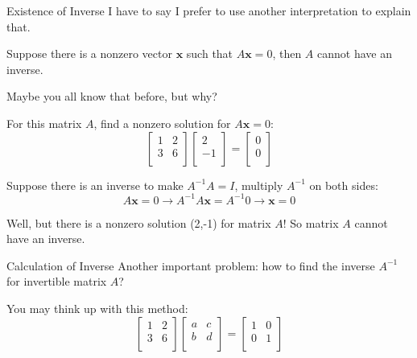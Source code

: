 \documentclass{beamer}
\begin{document}
\begin{frame}{Existence of Inverse}
I have to say I prefer to use another interpretation to explain that.

\begin{theorem}
Suppose there is a nonzero vector $\mathbf{x}$ such that $A\mathbf{x}=0$, then $A$ cannot have an inverse.
\end{theorem}

Maybe you all know that before, but why?

For this matrix $A$, find a nonzero solution for $A\mathbf{x}=0$:
\begin{equation*}
    \left[ \begin{matrix}
        1&		2\\
        3&		6\\
    \end{matrix} \right] \left[ \begin{array}{c}
        2\\
        -1\\
    \end{array} \right] =\left[ \begin{array}{c}
        0\\
        0\\
    \end{array} \right]
\end{equation*}

Suppose there is an inverse to make $A^{-1}A=I$, multiply $A^{-1}$ on both sides:
\begin{equation*}
    A\mathbf{x}=0\rightarrow A^{-1}A\mathbf{x}=A^{-1}0\rightarrow \mathbf{x}=0
\end{equation*}

Well, but there is a nonzero solution (2,-1) for matrix $A$! So matrix $A$ cannot have an inverse.
\end{frame}

\begin{frame}{Calculation of Inverse}
Another important problem: how to find the inverse $A^{-1}$ for invertible matrix $A$?

You may think up with this method:
\begin{equation*}
    \left[ \begin{matrix}
        1&		2\\
        3&		6\\
    \end{matrix} \right] \left[ \begin{matrix}
        a&		c\\
        b&		d\\
    \end{matrix} \right] =\left[ \begin{matrix}
        1&		0\\
        0&		1\\
    \end{matrix} \right]
\end{equation*}

\end{frame}
\end{document}

